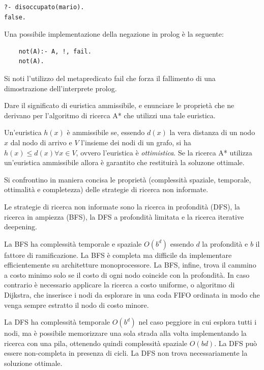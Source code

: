 \documentclass[answers, a4paper, 11pt]{exam}
\begin{document}
\begin{questions}
\begin{solution}
\begin{verbatim}
?- disoccupato(mario).
false.

  \end{verbatim}
  Una possibile implementazione della negazione in prolog è la seguente: \newline
  \begin{verbatim}
    not(A):- A, !, fail.
    not(A).
  \end{verbatim}
  Si noti l'utilizzo del metapredicato fail che forza il fallimento di una dimostrazione dell'interprete prolog.
    \end{solution}


\question Dare il significato di euristica ammissibile, e enunciare le proprietà che ne derivano per l’algoritmo
di ricerca A* che utilizzi una tale euristica.
	\begin{solution}
		Un'euristica $h(x)$ è ammissibile se, essendo $d(x)$ la vera distanza di un nodo $x$ dal nodo di arrivo e $V$ l'insieme dei nodi di un grafo, si ha $h(x) \leq d(x) \forall x \in V$, ovvero l'euristica è \emph{ottimistica}. 
		Se la ricerca A* utilizza un'euristica ammissibile allora è garantito che restituirà la soluzone ottimale. 
	\end{solution}
\question Si confrontino in maniera concisa le proprietà (complessità spaziale, temporale, ottimalità e completezza) delle strategie di ricerca non informate.
\begin{solution}
  Le strategie di  ricerca non informate sono la ricerca in profondità (DFS), la ricerca in ampiezza (BFS), la DFS a profondità limitata e la ricerca iterative deepening. 

  La BFS ha complessità temporale e spaziale $O(b^d)$ essendo $d$ la profondità e $b$ il fattore di ramificazione.
  La BFS è completa ma difficile da implementare efficientemente su architetture monoprocessore.
  La BFS, infine, trova il cammino a costo minimo solo se il costo di ogni nodo coincide con la profondità. 
  In caso contrario è necessario applicare la ricerca a costo uniforme, o algoritmo di Dijkstra, che inserisce i nodi da esplorare in una coda FIFO ordinata in modo che venga sempre estratto il nodo di costo minore. 
  
  La DFS ha complessità temporale $O(b^d)$ nel caso peggiore in cui esplora tutti i nodi, ma è possibile memorizzare una sola strada alla volta implementando la ricerca con una pila, ottenendo quindi complessità spaziale $O(bd)$. 
  La DFS può essere non-completa in presenza di cicli. 
  La DFS non trova necessariamente la soluzione ottimale. 


\end{solution}
\end{questions}
\end{document}
